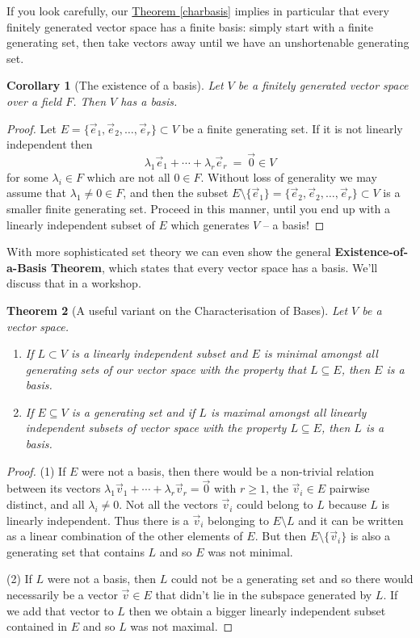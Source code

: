 \documentclass[11pt]{amsbook}
\newtheorem{theorem}{Theorem}[section]
\newtheorem{corollary}[theorem]{Corollary}
\theoremstyle{definition}
\begin{document}
If you look carefully, our \hyperref[charbasis]{Theorem \ref{charbasis}} implies in particular that every finitely generated vector space has a finite basis: simply start with a finite generating set, then take vectors away until we have an unshortenable generating set.
\begin{corollary}[The existence of a basis] \label{existencebasis} Let $V$ be a finitely generated vector space over a field $F$. Then $V$ has a basis.
\end{corollary}
\begin{proof}
Let $E=\{\vec{e}_1,\vec{e}_2,\dots,\vec{e}_r\} \subset V$ be a finite generating set. If it is not linearly independent then
$$ \lambda_1 \vec{e}_1 + \cdots + \lambda_r \vec{e}_r~=~\vec{0} \in V$$
for some $\lambda_i\in F$ which are not all $0 \in F$. Without loss of generality we may assume that $\lambda_1 \neq 0 \in F$, and then the
subset $E \setminus \{\vec{e}_1\}=\{\vec{e}_2,\vec{e}_2,\dots,\vec{e}_r\} \subset V$
is a smaller finite generating set. Proceed in this manner, until you end up with
a linearly independent subset of $E$ which generates $V$ -- a basis!
\end{proof}
With more sophisticated set theory we can even show the general {\bf Existence-of-a-Basis Theorem}, which states that every vector space has a basis. We'll discuss that in a workshop.

\begin{theorem}[A useful variant on the Characterisation of Bases] Let $V$ be a vector space.
\begin{enumerate}
\item If $L\subset V$ is a linearly independent subset and $E$ is minimal amongst all generating sets of our vector space with the property that $L\subseteq E$, then $E$ is a basis.
\item If $E\subseteq V$ is a generating set and if $L$ is maximal amongst all linearly independent subsets of vector space with the property $L\subseteq E$, then $L$ is a basis.
\end{enumerate}
\end{theorem}

\begin{proof} (1) If $E$ were not a basis, then there would be a non-trivial relation between its vectors $\lambda_1\vec{v}_1 + \cdots +  \lambda_r\vec{v}_r = \vec{0}$ with $r\geqslant 1$, the $\vec{v}_i\in E$ pairwise distinct, and all $\lambda_i \neq 0$. Not all the vectors $\vec{v}_i$ could belong to $L$ because $L$ is linearly independent. Thus there is a $\vec{v}_i$ belonging to $E\setminus L$ and it can be written as a linear combination of the other elements of $E$. But then $E\setminus \{ \vec{v}_i \}$ is also a generating set that contains $L$ and so $E$ was not minimal.

(2) If $L$ were not a basis, then $L$ could not be a generating set and so there would necessarily be a vector $\vec{v}\in E$ that didn't lie in the subspace generated by $L$. If we add that vector to $L$ then we obtain a bigger linearly independent subset contained in $E$ and so $L$ was not maximal. \end{proof}
\end{document}
